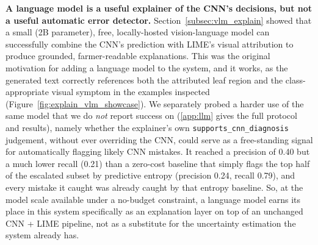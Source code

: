 \textbf{A language model is a useful explainer of the CNN's decisions, but not a useful automatic error detector.} Section~\ref{subsec:vlm_explain} showed that a small (2B parameter), free, locally-hosted vision-language model can successfully combine the CNN's prediction with LIME's visual attribution to produce grounded, farmer-readable explanations. This was the original motivation for adding a language model to the system, and it works, as the generated text correctly references both the attributed leaf region and the class-appropriate visual symptom in the examples inspected (Figure~\ref{fig:explain_vlm_showcase}). We separately probed a harder use of the same model that we do \emph{not} report success on (\ref{app:llm} gives the full protocol and results), namely whether the explainer's own \texttt{supports\_cnn\_diagnosis} judgement, without ever overriding the CNN, could serve as a free-standing signal for automatically flagging likely CNN mistakes. It reached a precision of 0.40 but a much lower recall (0.21) than a zero-cost baseline that simply flags the top half of the escalated subset by predictive entropy (precision 0.24, recall 0.79), and every mistake it caught was already caught by that entropy baseline. So, at the model scale available under a no-budget constraint, a language model earns its place in this system specifically as an explanation layer on top of an unchanged CNN + LIME pipeline, not as a substitute for the uncertainty estimation the system already has.


